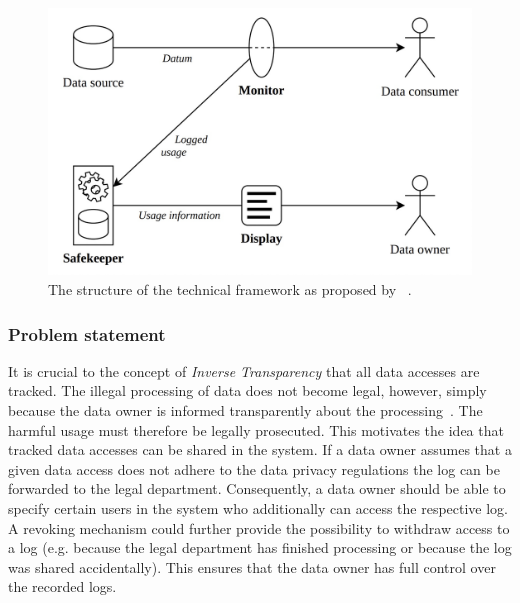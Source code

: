 \documentclass[../main.tex]{subfiles}
\begin{document}
\begin{figure}[ht]
    \includegraphics[scale=0.15]{../img/01/toolchain.jpg}
    \centering
    \caption[Existing toolchain]{The structure of the technical framework as proposed by \citeauthor{Zieglmeier2021}~\cite{Zieglmeier2021}.}
    \label{fig:toolchain}
\end{figure}

\subsubsection{Problem statement}

It is crucial to the concept of \emph{Inverse Transparency} that all data accesses are tracked.
The illegal processing of data does not become legal, however, simply because the data owner is informed transparently about the processing~\cite{Boes2022}.
The harmful usage must therefore be legally prosecuted.
This motivates the idea that tracked data accesses can be shared in the system.
If a data owner assumes that a given data access does not adhere to the data privacy regulations the log can be forwarded to the legal department.
Consequently, a data owner should be able to specify certain users in the system who additionally can access the respective log.
A revoking mechanism could further provide the possibility to withdraw access to a log (e.g. because the legal department has finished processing or because the log was shared accidentally).
This ensures that the data owner has full control over the recorded logs.
\end{document}
